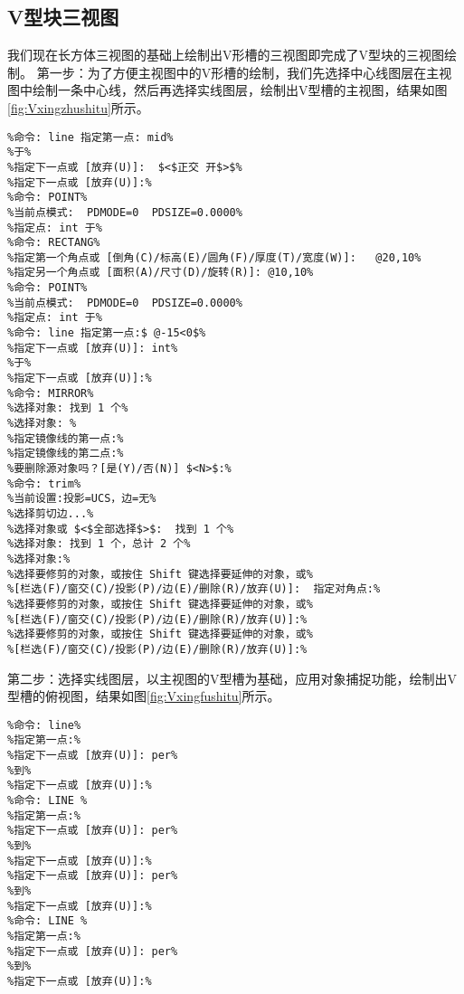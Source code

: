 \subsection{V型块三视图}
我们现在长方体三视图的基础上绘制出V形槽的三视图即完成了V型块的三视图绘制。
第一步：为了方便主视图中的V形槽的绘制，我们先选择中心线图层在主视图中绘制一条中心线，然后再选择实线图层，绘制出V型槽的主视图，结果如图\ref{fig:Vxingzhushitu}所示。
\begin{lstlisting}
%命令: line 指定第一点: mid%
%于%
%指定下一点或 [放弃(U)]:  $<$正交 开$>$%
%指定下一点或 [放弃(U)]:%
%命令: POINT%
%当前点模式:  PDMODE=0  PDSIZE=0.0000%
%指定点: int 于%
%命令: RECTANG%
%指定第一个角点或 [倒角(C)/标高(E)/圆角(F)/厚度(T)/宽度(W)]:   @20,10%
%指定另一个角点或 [面积(A)/尺寸(D)/旋转(R)]: @10,10%
%命令: POINT%
%当前点模式:  PDMODE=0  PDSIZE=0.0000%
%指定点: int 于%
%命令: line 指定第一点:$ @-15<0$%
%指定下一点或 [放弃(U)]: int%
%于%
%指定下一点或 [放弃(U)]:%
%命令: MIRROR%
%选择对象: 找到 1 个%
%选择对象: % 
%指定镜像线的第一点:%
%指定镜像线的第二点:%
%要删除源对象吗？[是(Y)/否(N)] $<N>$:%
%命令: trim%
%当前设置:投影=UCS，边=无%
%选择剪切边...%
%选择对象或 $<$全部选择$>$:  找到 1 个%
%选择对象: 找到 1 个，总计 2 个%
%选择对象:%
%选择要修剪的对象，或按住 Shift 键选择要延伸的对象，或%
%[栏选(F)/窗交(C)/投影(P)/边(E)/删除(R)/放弃(U)]:  指定对角点:%
%选择要修剪的对象，或按住 Shift 键选择要延伸的对象，或%
%[栏选(F)/窗交(C)/投影(P)/边(E)/删除(R)/放弃(U)]:%
%选择要修剪的对象，或按住 Shift 键选择要延伸的对象，或%
%[栏选(F)/窗交(C)/投影(P)/边(E)/删除(R)/放弃(U)]:%
\end{lstlisting}

\begin{figure}[htbp]
\centering
\begin{floatrow}
\end{floatrow}
\end{figure}
第二步：选择实线图层，以主视图的V型槽为基础，应用对象捕捉功能，绘制出V型槽的俯视图，结果如图\ref{fig:Vxingfushitu}所示。
\begin{lstlisting}
%命令: line% 
%指定第一点:%
%指定下一点或 [放弃(U)]: per%
%到%
%指定下一点或 [放弃(U)]:%
%命令: LINE %
%指定第一点:%
%指定下一点或 [放弃(U)]: per%
%到%
%指定下一点或 [放弃(U)]:%
%指定下一点或 [放弃(U)]: per%
%到%
%指定下一点或 [放弃(U)]:%
%命令: LINE %
%指定第一点:%
%指定下一点或 [放弃(U)]: per%
%到%
%指定下一点或 [放弃(U)]:%
\end{lstlisting}

